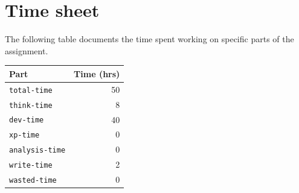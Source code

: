 \documentclass{acm_proc_article-sp}
\begin{document}
{}


\appendix
\section{Time sheet}

The following table documents the time spent working on specific parts of the assignment.

\begin{tabular}{ | l | r | }
	\hline
	Part & Time (hrs) \\ \hline \hline
	\texttt{total-time} & 50\\ \hline
	\texttt{think-time} & 8\\ \hline
	\texttt{dev-time} & 40\\ \hline
	\texttt{xp-time} & 0\\ \hline
	\texttt{analysis-time} & 0\\ \hline
	\texttt{write-time} & 2\\ \hline
	\texttt{wasted-time} & 0\\ \hline
\end{tabular}
\end{document}
